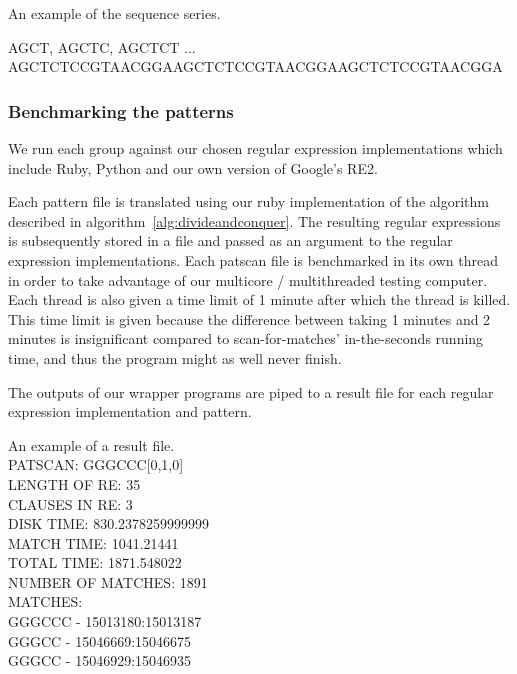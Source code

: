 \documentclass[12pt]{article}
\theoremstyle{definition}
\begin{document}
\begin{example}
An example of the sequence series.

\begin{center}
AGCT,  AGCTC, AGCTCT ... AGCTCTCCGTAACGGAAGCTCTCCGTAACGGAAGCTCTCCGTAACGGA
\end{center}
\end{example}

\subsubsection{Benchmarking the patterns}

We run each group against our chosen regular expression implementations which include Ruby, Python and our own version of Google's RE2.
 
Each pattern file is translated using our ruby implementation of the algorithm described in algorithm~\ref{alg:divideandconquer}. The resulting regular expressions is subsequently stored in a file and passed as an argument to the regular expression implementations. Each patscan file is benchmarked in its own thread in order to take advantage of our multicore / multithreaded testing computer. Each thread is also given a time limit of 1 minute after which the thread is killed. This time limit is given because the difference between taking 1 minutes and 2 minutes is insignificant compared to scan-for-matches' in-the-seconds running time, and thus the program might as well never finish.

The outputs of our wrapper programs are piped to a result file for each regular expression implementation and pattern.

\begin{example} 
An example of a result file.\\
PATSCAN: GGGCCC[0,1,0]\\
LENGTH OF RE: 35\\
CLAUSES IN RE: 3\\
DISK TIME: 830.2378259999999\\
MATCH TIME: 1041.21441\\
TOTAL TIME: 1871.548022\\
NUMBER OF MATCHES: 1891\\
MATCHES:\\
GGGCCC - 15013180:15013187\\
GGGCC - 15046669:15046675\\
GGGCC - 15046929:15046935\\
\end{example}
\end{document}

